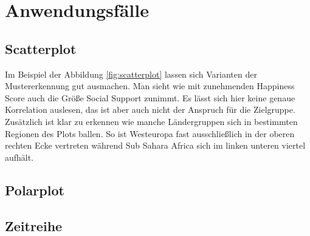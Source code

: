 \section{Anwendungsfälle}

\subsection{Scatterplot}

Im Beispiel der Abbildung \ref{fig:scatterplot} lassen sich Varianten der Mustererkennung gut ausmachen. Man sieht wie mit zunehmenden Happiness Score auch die Größe Social Support zunimmt. Es lässt sich hier keine genaue Korrelation auslesen, das ist aber auch nicht der Anspruch für die Zielgruppe. Zusätzlich ist klar zu erkennen wie manche Ländergruppen sich in bestimmten Regionen des Plots ballen. So ist Westeuropa fast ausschließlich in der oberen rechten Ecke vertreten während Sub Sahara Africa sich im linken unteren viertel aufhält. 

\subsection{Polarplot}

\subsection{Zeitreihe}